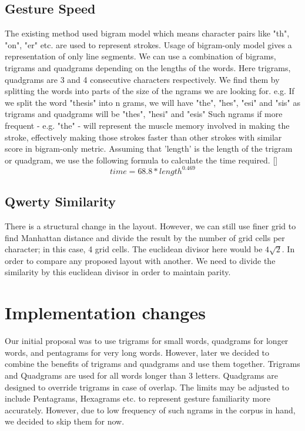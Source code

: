 \documentclass[MTech]{iitmdiss}
\begin{document}
\subsection{Gesture Speed}
The existing method used bigram model which means character pairs like "th", "on", "er" etc. are used to represent strokes. Usage of bigram-only model gives a representation of only line segments. We can use a combination of bigrams, trigrams and quadgrams depending on the lengths of the words. Here trigrams, quadgrams are 3 and 4 consecutive characters respectively. We find them by splitting the words into parts of the size of the ngrams we are looking for. e.g. If we split the word "thesis" into n grams, we will have "the", "hes", "esi" and "sis" as trigrams and quadgrams will be "thes", "hesi" and "esis" Such ngrams if more frequent - e.g. "the" - will represent the muscle memory involved in making the stroke, effectively making those strokes faster than other strokes with similar score in bigram-only metric. Assuming that 'length' is the length of the trigram or quadgram, we use the following formula to calculate the time required.  [\cite{strokes}] 
\begin{equation}
time = 68.8 * length^{0.469} \end{equation}

\subsection{Qwerty Similarity}
There is a structural change in the layout. However, we can still use finer grid to find Manhattan distance and divide the result by the number of grid cells per character; in this case, 4 grid cells. The euclidean divisor here would be $4 \sqrt{2}$. In order to compare any proposed layout with another. We need to divide the similarity by this euclidean divisor in order to maintain parity.

\section{Implementation changes}
Our initial proposal was to use trigrams for small words, quadgrams for longer words, and pentagrams for very long words. However, later we decided to combine the benefits of trigrams and quadgrams and use them together.
Trigrams and Quadgrams are used for all words longer than 3 letters.
Quadgrams are designed to override trigrams in case of overlap.
The limits may be adjusted to include Pentagrams, Hexagrams etc. to represent gesture familiarity more accurately. However, due to low frequency of such ngrams in the corpus in hand, we decided to skip them for now.
\end{document}
